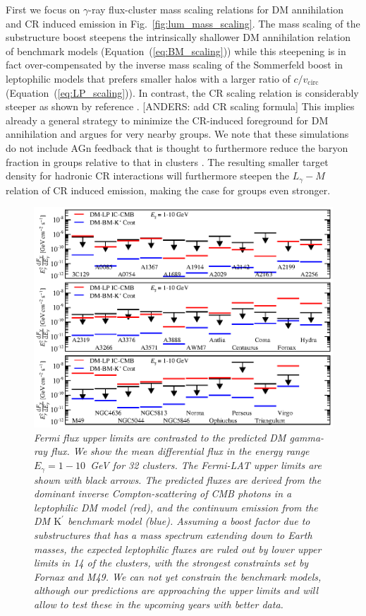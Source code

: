 \documentclass[10pt,aps,pra,reprint,amsmath,amsfonts,amssymb,showpacs]{revtex4-1}
\newcommand{\rmn}{\mathrm}
\newcommand{\Kp}{\rmn{K}^\prime}
\begin{document}
First we focus on $\gamma$-ray flux-cluster mass scaling relations for DM
annihilation and CR induced emission in Fig.~\ref{fig:lum_mass_scaling}.  The
mass scaling of the substructure boost steepens the intrinsically shallower DM
annihilation relation of benchmark models (Equation~(\ref{eq:BM_scaling})) while
this steepening is in fact over-compensated by the inverse mass scaling of the
Sommerfeld boost in leptophilic models that prefers smaller halos with a larger
ratio of $c/v_\mathrm{circ}$ (Equation~(\ref{eq:LP_scaling})). In contrast, the
CR scaling relation is considerably steeper as shown by reference
\cite{2010MNRAS.409..449P}. [ANDERS: add CR scaling formula] This implies
already a general strategy to minimize the CR-induced foreground for DM
annihilation and argues for very nearby groups. We note that these simulations
do not include AGn feedback that is thought to furthermore reduce the baryon
fraction in groups relative to that in clusters \cite{2008ApJ...687L..53P}. The
resulting smaller target density for hadronic CR interactions will furthermore
steepen the $L_\gamma-M$ relation of CR induced emission, making the case for
groups even stronger.

\begin{figure}
\begin{minipage}{2.0\columnwidth}
  \includegraphics[width=0.99\columnwidth]{figures/Fermi.comp.DM.eps}
  \caption{\it Fermi flux upper limits are contrasted to the predicted DM
    gamma-ray flux. We show the mean differential flux in the energy range
    $E_\gamma=1-10$~GeV for 32 clusters. The Fermi-LAT upper limits are shown
    with black arrows. The predicted fluxes are derived from the dominant
    inverse Compton-scattering of CMB photons in a leptophilic DM model (red),
    and the continuum emission from the DM $\Kp$ benchmark model
    (blue). Assuming a boost factor due to substructures that has a mass
    spectrum extending down to Earth masses, the expected leptophilic fluxes are
    ruled out by lower upper limits in 14 of the clusters, with the strongest
    constraints set by Fornax and M49. We can not yet constrain the benchmark
    models, although our predictions are approaching the upper limits and will
    allow to test these in the upcoming years with better data.}
 \label{fig14}
\end{minipage}
\end{figure}
\end{document}
